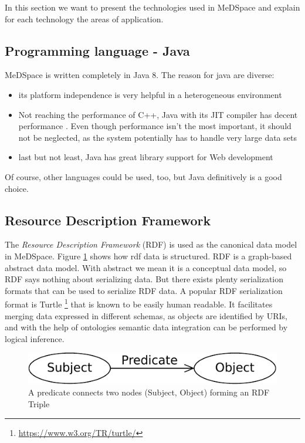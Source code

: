 In this section we want to present the technologies used in MeDSpace and explain for each technology the areas of application.

\subsection{Programming language - Java}
MeDSpace is written completely in Java 8. The reason for java are diverse: 
\begin{itemize}
\item its platform independence is very helpful in a heterogeneous environment
\item Not reaching the performance of C++, Java with its JIT compiler has decent performance \cite[p. 425]{TABOADA2013425}. Even though performance isn't the most important, it should not be 
  neglected, as the system potentially has to handle very large data sets
\item last but not least, Java has great library support for Web development
\end{itemize}

Of course, other languages could be used, too, but Java definitively is a good choice.


\subsection{Resource Description Framework}

The \emph{Resource Description Framework} (RDF) \cite{w3RDF} is used as the canonical data model in MeDSpace. Figure \ref{RdfTriple} shows how rdf data is structured. RDF is a graph-based abstract data model. With abstract we mean it is a conceptual data model, so RDF says nothing about serializing data. But there exists plenty serialization formats that can be used to serialize RDF data. A popular RDF serialization format is Turtle \footnote{\url{https://www.w3.org/TR/turtle/}} that is known to be easily human readable.
It facilitates merging data expressed in different schemas, as objects are identified by URIs, and with the help of ontologies semantic data integration can be performed by logical inference. 


\begin{figure}[H]
	\begin{center}
		\includegraphics[scale=0.75]{figures/rdf-graph.pdf}
	\end{center}
	\caption{A predicate connects two nodes (Subject, Object) forming an RDF Triple}
	\label{RdfTriple}
	\footnotemark
\end{figure}

